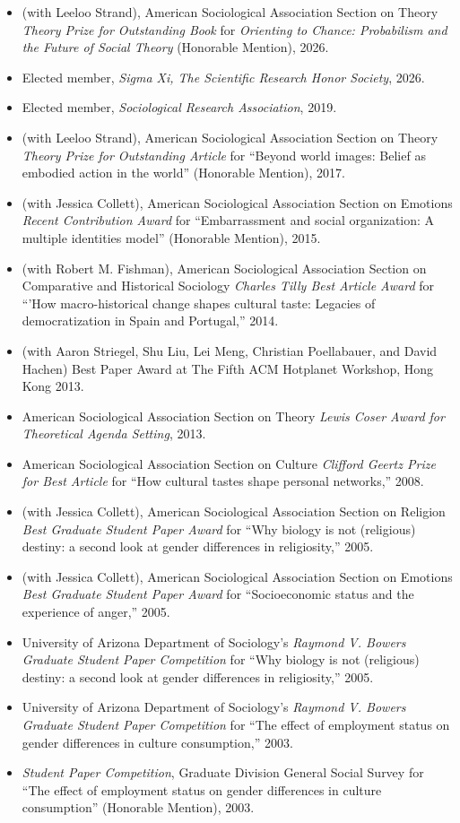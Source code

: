 \documentclass[
]{article}
\begin{document}
\begin{itemize}
\item
  (with Leeloo Strand), American Sociological Association Section on
  Theory \emph{Theory Prize for Outstanding Book} for \emph{Orienting to
  Chance: Probabilism and the Future of Social Theory} (Honorable
  Mention), 2026.
\item
  Elected member, \emph{Sigma Xi, The Scientific Research Honor
  Society}, 2026.
\item
  Elected member, \emph{Sociological Research Association}, 2019.
\item
  (with Leeloo Strand), American Sociological Association Section on
  Theory \emph{Theory Prize for Outstanding Article} for ``Beyond world
  images: Belief as embodied action in the world'' (Honorable Mention),
  2017.
\item
  (with Jessica Collett), American Sociological Association Section on
  Emotions \emph{Recent Contribution Award} for ``Embarrassment and
  social organization: A multiple identities model'' (Honorable
  Mention), 2015.
\item
  (with Robert M. Fishman), American Sociological Association Section on
  Comparative and Historical Sociology \emph{Charles Tilly Best Article
  Award} for ``'How macro-historical change shapes cultural taste:
  Legacies of democratization in Spain and Portugal,'' 2014.
\item
  (with Aaron Striegel, Shu Liu, Lei Meng, Christian Poellabauer, and
  David Hachen) Best Paper Award at The Fifth ACM Hotplanet Workshop,
  Hong Kong 2013.
\item
  American Sociological Association Section on Theory \emph{Lewis Coser
  Award for Theoretical Agenda Setting}, 2013.
\item
  American Sociological Association Section on Culture \emph{Clifford
  Geertz Prize for Best Article} for ``How cultural tastes shape
  personal networks,'' 2008.
\item
  (with Jessica Collett), American Sociological Association Section on
  Religion \emph{Best Graduate Student Paper Award} for ``Why biology is
  not (religious) destiny: a second look at gender differences in
  religiosity,'' 2005.
\item
  (with Jessica Collett), American Sociological Association Section on
  Emotions \emph{Best Graduate Student Paper Award} for ``Socioeconomic
  status and the experience of anger,'' 2005.
\item
  University of Arizona Department of Sociology's \emph{Raymond V.
  Bowers Graduate Student Paper Competition} for ``Why biology is not
  (religious) destiny: a second look at gender differences in
  religiosity,'' 2005.
\item
  University of Arizona Department of Sociology's \emph{Raymond V.
  Bowers Graduate Student Paper Competition} for ``The effect of
  employment status on gender differences in culture consumption,''
  2003.
\item
  \emph{Student Paper Competition}, Graduate Division General Social
  Survey for ``The effect of employment status on gender differences in
  culture consumption'' (Honorable Mention), 2003.
\end{itemize}
\end{document}
